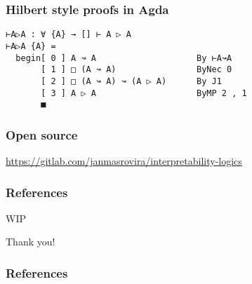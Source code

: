 \documentclass{beamer}
\begin{document}
\begin{frame}[fragile]
  \frametitle{Hilbert style proofs in Agda}
\begin{verbatim}
⊢A▷A : ∀ {A} → [] ⊢ A ▷ A
⊢A▷A {A} =
  begin[ 0 ] A ↝ A                    By ⊢A↝A
       [ 1 ] □ (A ↝ A)                ByNec 0
       [ 2 ] □ (A ↝ A) ↝ (A ▷ A)      By J1
       [ 3 ] A ▷ A                    ByMP 2 , 1
       ■
\end{verbatim}
\end{frame}


\begin{frame}
  \frametitle{Open source}
  \centering
  \url{https://gitlab.com/janmasrovira/interpretability-logics}
\end{frame}

\begin{frame}
  \frametitle{References}
  WIP
\end{frame}


\begin{frame}
  \centering \Huge Thank you!
\end{frame}

\begin{frame}[allowframebreaks]
  \frametitle{References}
\end{frame}
\end{document}
